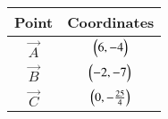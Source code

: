 \begin{tabular}{|c|c|}
\hline
   Point  & Coordinates \\
   \hline
	$\vec{A}$ & $\begin{pmatrix}6,-4\end{pmatrix}$\\
    \hline
	$\vec{B}$ & $\begin{pmatrix}-2,-7\end{pmatrix}$\\
    \hline
	$\vec{C}$ & $\begin{pmatrix}0,-\frac{25}{4}\end{pmatrix}$\\
    \hline
\end{tabular}
